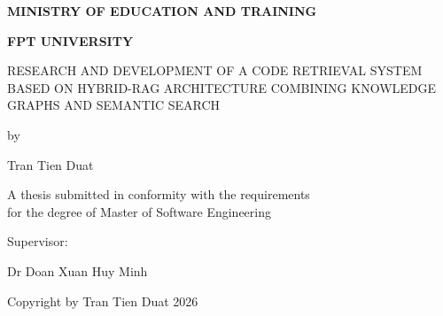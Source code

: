 \documentclass[12pt,letterpaper,oneside]{report}
\newcommand{\thesistitletext}{RESEARCH AND DEVELOPMENT OF A CODE RETRIEVAL SYSTEM BASED ON HYBRID-RAG ARCHITECTURE COMBINING KNOWLEDGE GRAPHS AND SEMANTIC SEARCH}
\newenvironment{physicalcenter}{%
    \par\noindent\hspace*{-18pt}\begin{minipage}[t]{\textwidth}\centering
}{%
    \end{minipage}\par
}
\begin{document}
\begin{titlepage}
    \thispagestyle{empty}
    \begin{physicalcenter}\sffamily
        {\bfseries\fontsize{15}{18}\selectfont MINISTRY OF EDUCATION AND TRAINING\par}
        {\bfseries\fontsize{15}{18}\selectfont FPT UNIVERSITY\par}
        \vspace{72pt}
        \begin{singlespace}
            {\fontsize{15}{18}\selectfont \thesistitletext\par}
        \end{singlespace}
        \vspace{71pt}
        {\fontsize{12}{14.4}\selectfont by\par}
        \vspace{78pt}
        {\fontsize{12}{14.4}\selectfont Tran Tien Duat\par}
        \vspace{48pt}
        {\fontsize{12}{14.4}\selectfont
        A thesis submitted in conformity with the requirements\\
        for the degree of Master of Software Engineering\par}
        \vspace{25pt}
        {\fontsize{12}{14.4}\selectfont Supervisor:\par}
        {\fontsize{12}{14.4}\selectfont Dr Doan Xuan Huy Minh\par}
        \vspace{76pt}
        {\fontsize{12}{14.4}\selectfont \textcopyright{} Copyright by Tran Tien Duat 2026\par}
    \end{physicalcenter}
\end{titlepage}
\end{document}
